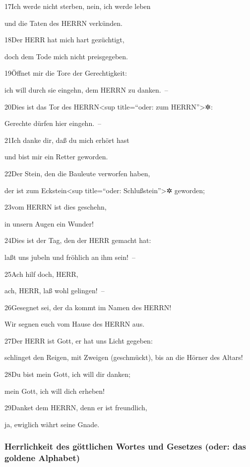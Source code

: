 17Ich werde nicht sterben, nein, ich werde leben

und die Taten des HERRN verkünden.

18Der HERR hat mich hart gezüchtigt,

doch dem Tode mich nicht preisgegeben.

19Öffnet mir die Tore der Gerechtigkeit:

ich will durch sie eingehn, dem HERRN zu danken.~--

20Dies ist das Tor des HERRN\textless sup title=``oder: zum
HERRN''\textgreater✲:

Gerechte dürfen hier eingehn.~--

21Ich danke dir, daß du mich erhört hast

und bist mir ein Retter geworden.

22Der Stein, den die Bauleute verworfen haben,

der ist zum Eckstein\textless sup title=``oder:
Schlußstein''\textgreater✲ geworden;

23vom HERRN ist dies geschehn,

in unsern Augen ein Wunder!

24Dies ist der Tag, den der HERR gemacht hat:

laßt uns jubeln und fröhlich an ihm sein!~--

25Ach hilf doch, HERR,

ach, HERR, laß wohl gelingen!~--

26Gesegnet sei, der da kommt im Namen des HERRN!

Wir segnen euch vom Hause des HERRN aus.

27Der HERR ist Gott, er hat uns Licht gegeben:

schlinget den Reigen, mit Zweigen (geschmückt), bis an die Hörner des
Altars!

28Du bist mein Gott, ich will dir danken;

mein Gott, ich will dich erheben!

29Danket dem HERRN, denn er ist freundlich,

ja, ewiglich währt seine Gnade.

\hypertarget{herrlichkeit-des-guxf6ttlichen-wortes-und-gesetzes-oder-das-goldene-alphabet}{%
\subsubsection{Herrlichkeit des göttlichen Wortes und Gesetzes (oder:
das goldene
Alphabet)}\label{herrlichkeit-des-guxf6ttlichen-wortes-und-gesetzes-oder-das-goldene-alphabet}}

